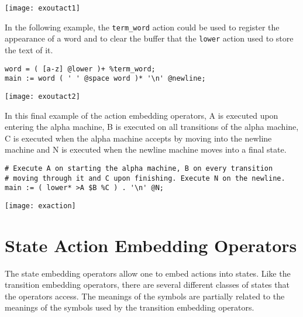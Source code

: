 \documentclass[letterpaper,11pt,oneside]{book}
\newcommand{\graphspace}{\vspace{10pt}}
\newenvironment{inline_code}{\def\baselinestretch{1}\vspace{12pt}\small}{}
\begin{document}
\graphspace
\begin{center}
\texttt{[image: exoutact1]}
\end{center}
\graphspace

In the following example, the \verb|term_word| action could be used to register
the appearance of a word and to clear the buffer that the \verb|lower| action used
to store the text of it.

\begin{inline_code}
\begin{verbatim}
word = ( [a-z] @lower )+ %term_word;
main := word ( ' ' @space word )* '\n' @newline;
\end{verbatim}
\end{inline_code}

\graphspace
\begin{center}
\texttt{[image: exoutact2]}
\end{center}
\graphspace


In this final example of the action embedding operators, A is executed upon
entering the alpha machine, B is executed on all transitions of the alpha
machine, C is executed when the alpha machine accepts by moving into the
newline machine and N is executed when the newline machine moves into a final
state.  

\begin{inline_code}
\begin{verbatim}
# Execute A on starting the alpha machine, B on every transition 
# moving through it and C upon finishing. Execute N on the newline.
main := ( lower* >A $B %C ) . '\n' @N;
\end{verbatim}
\end{inline_code}

\graphspace
\begin{center}
\texttt{[image: exaction]}
\end{center}
\graphspace


\section{State Action Embedding Operators}

The state embedding operators allow one to embed actions into states. Like the
transition embedding operators, there are several different classes of states
that the operators access. The meanings of the symbols are partially related to
the meanings of the symbols used by the transition embedding operators. 
\end{document}
